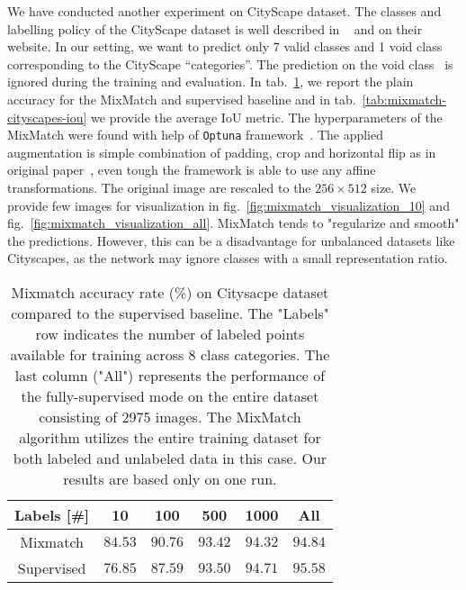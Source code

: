We have conducted another experiment on CityScape dataset. The classes and labelling policy of the CityScape
dataset is well described in ~\cite{cityscapes-2016} and on their website. In our setting, we want to predict only 
7 valid classes and 1 void class corresponding to the CityScape ``categories''. The prediction on the void class \
is ignored during the training and evaluation. In tab.~\ref{tab:mixmatch-cityscapes}, we report the plain accuracy for 
the MixMatch and supervised baseline and in tab.~\ref{tab:mixmatch-cityscapes-iou} we provide the average $\mathrm{IoU}$ metric. 
The hyperparameters of the MixMatch were found with help of \texttt{Optuna} framework~\cite{optuna-2019}.
The applied augmentation is simple combination of padding, crop and horizontal flip as in original paper~\cite{mixmatch-2019}, even
tough the framework is able to use any affine transformations. The original image are rescaled to the $256 \times 512$ size.
We provide few images for visualization in fig.~\ref{fig:mixmatch_visualization_10} and fig.~\ref{fig:mixmatch_visualization_all}. 
MixMatch tends to "regularize and smooth" the predictions. However, this can be a disadvantage for unbalanced datasets 
like Cityscapes, as the network may ignore classes with a small representation ratio.

\begin{table}[tbh]
    \begin{tabular}{|c|c|c|c|c|c|}
    \hline
    Labels [\#]  & 10 & 100 & 500 & 1000 & All \\
    \hline
    Mixmatch & $84.53$ & $90.76$ & $93.42$ & $94.32$ & $94.84$ \\
    \hline
    Supervised & $76.85$ & $87.59$ & $93.50$ & $94.71$ & $95.58$ \\
    \hline
    \end{tabular}
    \caption[Mixmatch accuracy on CityScape]{Mixmatch accuracy rate (\%) on Citysacpe dataset compared to the supervised baseline. The 
    "Labels" row indicates the number of labeled points available for training across 8 class categories. The last 
    column ("All") represents the performance of the fully-supervised mode on the entire dataset consisting of 2975 images. 
    The MixMatch algorithm utilizes the entire training dataset for both labeled and unlabeled data in this case.
    Our results are based only on one run.}
    \label{tab:mixmatch-cityscapes}
\end{table}

